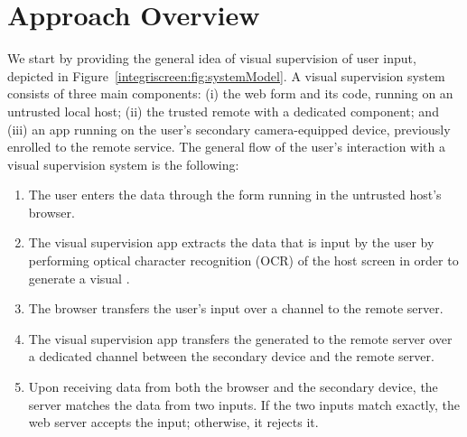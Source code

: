 \section{Approach Overview}
\label{integriscreen:sec:systemDesign}





We start by providing the general idea of visual supervision of user input, depicted in Figure~\ref{integriscreen:fig:systemModel}.
A visual supervision system consists of three main components: (i) the web form and its code, running on an untrusted local host; (ii) the trusted remote \server with a dedicated component; and (iii) an app running on the user's secondary camera-equipped device, previously enrolled to the remote service. The general flow of the user's interaction with a visual supervision system is the following:

\begin{enumerate}
  \item[\one] The user enters the data through the form running in the untrusted host's browser.

  \item[\two] The visual supervision app extracts the data that is input by the user by performing optical character recognition (OCR) of the host screen in order to generate a visual \textit{\POI}.

  \item[\three] The browser transfers the user's input over a \https channel to the remote server.

  \item[\four] The visual supervision app transfers the generated \POI to the remote server over a dedicated \tls channel between the secondary device and the remote server.

  \item[\five] Upon receiving data from both the browser and the secondary device, the server matches the data from two inputs.
  If the two inputs match exactly, the web server accepts the input; otherwise, it rejects it.
\end{enumerate}


